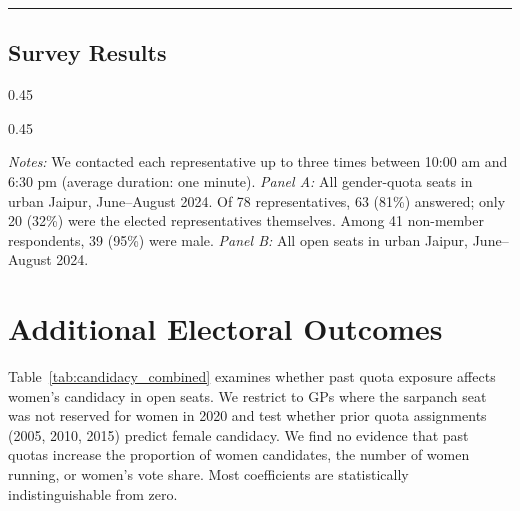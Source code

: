 \documentclass[12pt]{article}
\begin{document}
\noindent\rule{\linewidth}{0.4pt}

\subsection{Survey Results}





\begin{table}[!htbp]
    \centering
    \caption{Urban Phone Survey Response Distribution (Jaipur)}
    \label{tab:urban_survey}
    \begin{subtable}[t]{0.45\linewidth}
        \centering
        \caption{Gender-Quota Seats}
        \label{tab:jaipur_quota}
        
    \end{subtable}
    \hspace{2em}
    \begin{subtable}[t]{0.45\linewidth}
        \centering
        \caption{Open Seats}
        \label{tab:jaipur_open}
        
    \end{subtable}
    \vspace{0.5ex}
    \parbox{0.9\textwidth}{\scriptsize
        \emph{Notes:} We contacted each representative up to three times between 10:00 am and 6:30 pm (average duration: one minute). \emph{Panel A:} All gender-quota seats in urban Jaipur, June--August 2024. Of 78 representatives, 63 (81\%) answered; only 20 (32\%) were the elected representatives themselves. Among 41 non-member respondents, 39 (95\%) were male. \emph{Panel B:} All open seats in urban Jaipur, June--August 2024.
    }
\end{table}
\FloatBarrier


\clearpage
\section{Additional Electoral Outcomes}\label{sec:app_outcomes}

Table~\ref{tab:candidacy_combined} examines whether past quota exposure affects women's candidacy in open seats. We restrict to GPs where the sarpanch seat was not reserved for women in 2020 and test whether prior quota assignments (2005, 2010, 2015) predict female candidacy. We find no evidence that past quotas increase the proportion of women candidates, the number of women running, or women's vote share. Most coefficients are statistically indistinguishable from zero.
\end{document}

